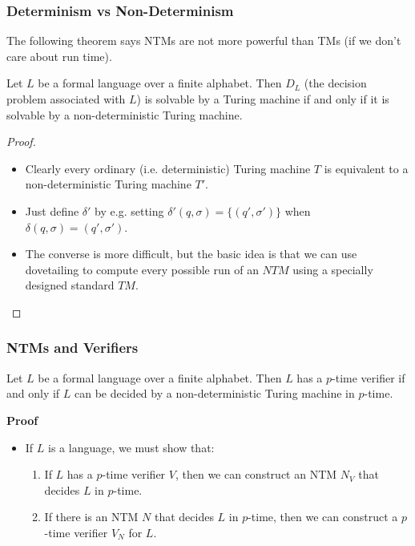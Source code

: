\documentclass[handout]{beamer}
\begin{document}
\begin{frame}
\frametitle{Determinism vs Non-Determinism}
The following theorem says NTMs are not more powerful than TMs (if we don't care about run time).

\begin{theorem}
Let $L$ be a formal language over a finite alphabet. Then $D_L$ (the decision problem associated with $L$) is solvable by a Turing machine if and only if it is solvable by a non-deterministic Turing machine. 
\end{theorem}
\begin{proof}
\begin{itemize}
\item Clearly every ordinary (i.e. deterministic) Turing machine $T$ is equivalent to a non-deterministic Turing machine $T'$.
\item  Just define $\delta'$ by e.g. setting $\delta'(q,\sigma)=\{(q',\sigma')\}$ when $\delta(q,\sigma)=(q',\sigma')$.
\item The converse is more difficult, but the basic idea is that we can use dovetailing to compute every possible run of an $NTM$ using a specially designed standard $TM$.
\end{itemize}
\end{proof}
\end{frame}

\begin{frame}
\frametitle{NTMs and Verifiers}
\begin{theorem}\label{T:NP}
Let $L$ be a formal language over a finite alphabet. Then $L$ has a $p$-time verifier if and only if $L$ can be decided by a non-deterministic Turing machine in $p$-time.
\end{theorem}
\vspace{0.5cm}
\textbf{Proof}
\vspace{0.5cm}
\begin{itemize}
\item If $L$ is a language, we must show that:
\vspace{0.5cm}
\begin{enumerate}
\item If $L$ has a $p$-time verifier $V$, then we can construct an NTM $N_V$ that decides $L$ in $p$-time.
\vspace{0.5cm}
\item If there is an NTM $N$ that decides $L$ in $p$-time, then we can construct a $p$-time verifier $V_N$ for $L$.
\end{enumerate}
\end{itemize}
\end{frame}
\end{document}
